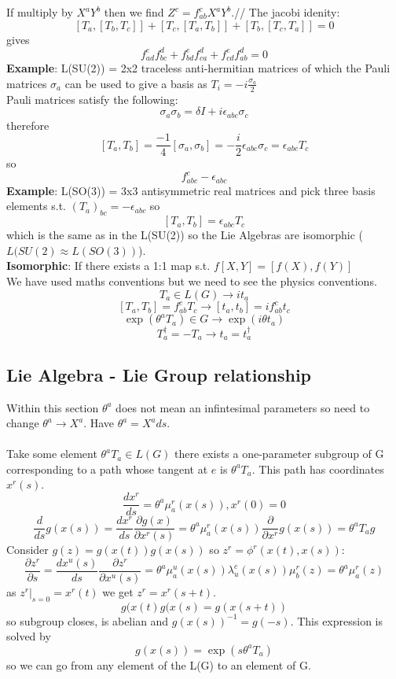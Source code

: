 \documentclass{article}
\begin{document}
{If multiply by $X^aY^b$ then we find $Z^c = f^c_{ab}X^aY^b$.//
The jacobi idenity:
$$
[T_a,[T_b,T_c]] + [T_c,[T_a,T_b]] + [T_b,[T_c,T_a]] = 0
$$
gives
$$
f^e_{ad}f^d_{bc} + f^e_{bd}f^d_{ca} + f^e_{cd}f^d_{ab} = 0
$$
\textbf{Example}: L(SU(2)) = { 2x2 traceless anti-hermitian matrices} of which the Pauli matrices $\sigma_a$ can be used to give a basis as $T_i = -i\frac{\sigma_a}{2}$
\\
Pauli matrices satisfy the following:
$$
\sigma_a\sigma_b = \delta I + i \epsilon_{abc}\sigma_c
$$
therefore
$$
[T_a, T_b] = \frac{-1}{4}[\sigma_a, \sigma_b] = - \frac{i}{2} \epsilon_{abc} \sigma_c = \epsilon_{abc} T_c
$$
so
$$
f^c_{abc} - \epsilon_{abc}
$$
\textbf{Example}: L(SO(3)) = { 3x3 antisymmetric real matrices } and pick three basis elements s.t. $(T_a)_{bc} = -\epsilon_{abc}$ so
$$
[T_a,T_b] = \epsilon_{abc}T_c
$$
which is the same as in the L(SU(2)) so the Lie Algebras are isomorphic ($L(SU(2) \approx L(SO(3))$).\\
\textbf{Isomorphic}: If there exists a 1:1 map s.t. $f[X,Y] = [f(X), f(Y)]$\\
We have used maths conventions but we need to see the physics conventions.
$$
T_a \in L(G) \rightarrow it_a
$$
$$
[T_a,T_b] = f^c_{ab}T_c \rightarrow [t_a,t_b] = i f^c_{ab}t_c
$$
$$
\exp(\theta^a T_a) \in G \rightarrow \exp(i\theta t_a)
$$
$$
T_a^{\dagger} = -T_a \rightarrow t_a= t_a^{\dagger}
$$
\subsection{Lie Algebra - Lie Group relationship}
Within this section $\theta^a$ does not mean an infintesimal parameters so need to change $\theta^a \rightarrow X^a$. Have $\theta^a = X^a ds$.\\\\
Take some element $\theta^a T_a \in L(G)$ there exists a one-parameter subgroup of G corresponding to a path whose tangent at $e$ is $\theta^aT_a$. This path has coordinates $x^r(s)$.
$$
\frac{dx^r}{ds} = \theta^a \mu_a^r(x(s)), x^r(0) = 0
$$
$$
\frac{d}{ds}g(x(s)) = \frac{dx^r}{ds} \frac{\partial g(x)}{\partial x^r(s)} = \theta^a \mu_a^r(x(s)) \frac{\partial}{\partial x^r} g(x(s)) = \theta^a T_a g
$$
Consider $g(z) = g(x(t))g(x(s))$ so $z^r = \phi^r(x(t),x(s))$:
$$
\frac{\partial z^r}{\partial s} = \frac{dx^u(s)}{ds}\frac{\partial z^r}{\partial x^u(s)} = \theta^a \mu_a^u(x(s))\lambda_u^c(x(s)) \mu_b^r(z) = \theta^a \mu_a^r(z)
$$
as $z^r|_{s=0} = x^r(t)$ we get $z^r = x^r(s+t)$.
$$
g(x(t)g(x(s) = g(x(s+t))
$$
so subgroup closes, is abelian and $g(x(s))^{-1} = g(-s)$. This expression is solved by
\begin{equation}
        g(x(s)) = \exp(s \theta^a T_a)
\end{equation}
so we can go from any element of the L(G) to an element of G.
}
\end{document}
